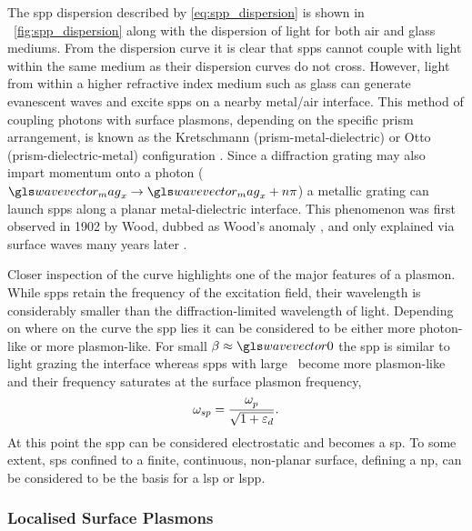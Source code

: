 \documentclass{article}
\begin{document}
The \gls{spp} dispersion described by \eqref{eq:spp_dispersion} is shown in \figurename~\ref{fig:spp_dispersion} along with the dispersion of light for both air and glass mediums. From the dispersion curve it is clear that \glspl{spp} cannot couple with light within the same medium as their dispersion curves do not cross. However, light from within a higher refractive index medium such as glass can generate evanescent waves and excite \glspl{spp} on a nearby metal/air interface. This method of coupling photons with surface plasmons, depending on the specific prism arrangement, is known as the Kretschmann (prism-metal-dielectric) or Otto (prism-dielectric-metal) configuration \cite{otto1968, kretschmann1971}. Since a diffraction grating may also impart momentum onto a photon ($\wvm_x \rightarrow \wvm_x + n\pi$) a metallic grating can launch \glspl{spp} along a planar metal-dielectric interface. This phenomenon was first observed in 1902 by Wood, dubbed as Wood's anomaly \cite{wood1902}, and only explained via surface waves many years later \cite{fano1941}.

Closer inspection of the curve highlights one of the major features of a plasmon. While \glspl{spp} retain the frequency of the excitation field, their wavelength is considerably smaller than the diffraction-limited wavelength of light.
Depending on where on the curve the \gls{spp} lies it can be considered to be either more photon-like or more plasmon-like. For small $\beta\approx\wvz$ the \gls{spp} is similar to light grazing the interface whereas \glspl{spp} with large \wvm\ become more plasmon-like and their frequency saturates at the surface plasmon frequency,
\begin{equation}
	\omega_{sp} = \frac{\omega_{p}^{}}{\sqrt{1+\varepsilon_d}}.
\end{equation}
At this point the \gls{spp} can be considered electrostatic and becomes a \gls{sp}. To some extent, \glspl{sp} confined to a finite, continuous, non-planar surface, defining a \gls{np}, can be considered to be the basis for a \gls{lsp} {\color{red}or \gls{lspp}}.

\subsubsection{Localised Surface Plasmons}
\end{document}

